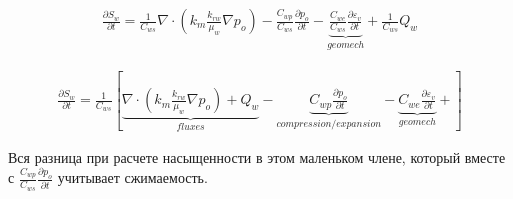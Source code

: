 \documentclass[14pt]{article}
\begin{document}
	\begin{eqnarray}
		 \frac{\partial S_{w}}{\partial t} =
		\frac{1}{C_{ws}} \nabla \cdot \left( k_{m} \frac{k_{rw}}{\mu_{w}} \nabla p_{o} \right) - 
		\frac{C_{wp}}{C_{ws}} \frac{\partial p_{o}}{\partial t} -
		\underbrace{ \frac{C_{we}}{C_{ws}} \frac{\partial \varepsilon_{v}}{\partial t} }_{geomech} +
		\frac{1}{C_{ws}} Q_{w}
	\end{eqnarray}
	
	\begin{eqnarray}
		\frac{\partial S_{w}}{\partial t} =
		\frac{1}{C_{ws}}  \left[ 
		\underbrace{ \nabla \cdot \left( k_{m} \frac{k_{rw}}{\mu_{w}} \nabla p_{o} \right) + 
	 	Q_{w} }_{fluxes} - 
		\underbrace{ C_{wp} \frac{\partial p_{o}}{\partial t} }_{compression/expansion} -
		\underbrace{ C_{we} \frac{\partial \varepsilon_{v}}{\partial t} }_{geomech} +
		 \right]
	\end{eqnarray}
	
	Вся разница при расчете насыщенности в этом маленьком члене, который вместе с $\frac{C_{wp}}{C_{ws}} \frac{\partial p_{o}}{\partial t}$ учитывает сжимаемость. 

\newpage


\newpage
\end{document}
